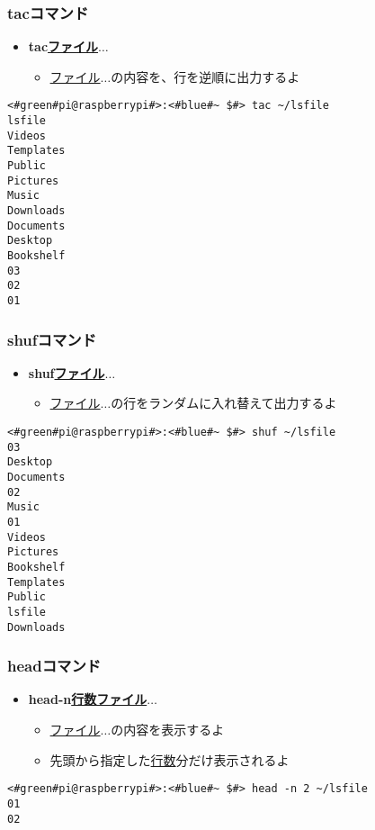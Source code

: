 \begin{frame}[fragile]
    \frametitle{tacコマンド}
    \begin{itemize}
        \item {\bf tac\textvisiblespace\underline{ファイル}$\ldots$}
        \begin{itemize}
            \small
            \item[] \underline{ファイル}$\ldots$の内容を、行を逆順に出力するよ
        \end{itemize}
    \end{itemize}
    \begin{lstlisting}[title=tacコマンドの実行例, label=tac_example]
<#green#pi@raspberrypi#>:<#blue#~ $#> tac ~/lsfile
lsfile
Videos
Templates
Public
Pictures
Music
Downloads
Documents
Desktop
Bookshelf
03
02
01 
    \end{lstlisting}
\end{frame}

\begin{frame}[fragile]
    \frametitle{shufコマンド}
    \begin{itemize}
        \item {\bf shuf\textvisiblespace\underline{ファイル}$\ldots$}
        \begin{itemize}
            \small
            \item \underline{ファイル}$\ldots$の行をランダムに入れ替えて出力するよ
        \end{itemize}
    \end{itemize}
    \begin{lstlisting}[title=shufコマンドの実行例, label=shuf_example]
<#green#pi@raspberrypi#>:<#blue#~ $#> shuf ~/lsfile
03
Desktop
Documents
02
Music
01
Videos
Pictures
Bookshelf
Templates
Public
lsfile
Downloads
    \end{lstlisting}
\end{frame}

\begin{frame}[fragile]
    \frametitle{headコマンド}
    \begin{itemize}
        \item {\bf head\textvisiblespace -n\textvisiblespace\underline{行数}\textvisiblespace\underline{ファイル}$\ldots$}
        \begin{itemize}
            \small
            \item[] \underline{ファイル}$\ldots$の内容を表示するよ
            \item[] 先頭から指定した\underline{行数}分だけ表示されるよ
        \end{itemize}
    \end{itemize}
    \begin{lstlisting}[title=headコマンドの実行例, label=head_example]
<#green#pi@raspberrypi#>:<#blue#~ $#> head -n 2 ~/lsfile 
01
02
    \end{lstlisting}
\end{frame}


